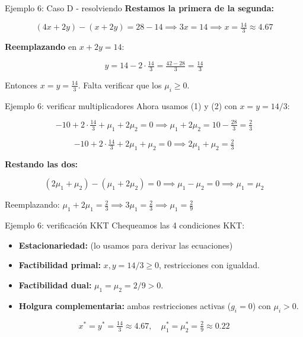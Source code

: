 \documentclass{beamer}
\begin{document}
\begin{frame}{Ejemplo 6: Caso D - resolviendo}
    \small
    \textbf{Restamos la primera de la segunda:}

    \[
    (4x + 2y) - (x + 2y) = 28 - 14 \implies 3x = 14 \implies x = \tfrac{14}{3} \approx 4.67
    \]

    \vspace{0.8em}

    \textbf{Reemplazando} en $x + 2y = 14$:

    \[
    y = 14 - 2 \cdot \tfrac{14}{3} = \tfrac{42 - 28}{3} = \tfrac{14}{3}
    \]

    \vspace{0.8em}

    Entonces $x = y = \frac{14}{3}$. Falta verificar que los $\mu_i \geq 0$.
\end{frame}

\begin{frame}{Ejemplo 6: verificar multiplicadores}
    \small
    Ahora usamos (1) y (2) con $x = y = 14/3$:

    \[
    -10 + 2 \cdot \tfrac{14}{3} + \mu_1 + 2\mu_2 = 0 \implies \mu_1 + 2\mu_2 = 10 - \tfrac{28}{3} = \tfrac{2}{3}
    \]

    \[
    -10 + 2 \cdot \tfrac{14}{3} + 2\mu_1 + \mu_2 = 0 \implies 2\mu_1 + \mu_2 = \tfrac{2}{3}
    \]

    \vspace{0.5em}

    \textbf{Restando las dos:}

    \[
    (2\mu_1 + \mu_2) - (\mu_1 + 2\mu_2) = 0 \implies \mu_1 - \mu_2 = 0 \implies \mu_1 = \mu_2
    \]

    \vspace{0.3em}

    Reemplazando: $\mu_1 + 2\mu_1 = \tfrac{2}{3} \implies 3\mu_1 = \tfrac{2}{3} \implies \mu_1 = \tfrac{2}{9}$
\end{frame}

\begin{frame}{Ejemplo 6: verificación KKT}
    \small
    Chequeamos las 4 condiciones KKT:

    \vspace{0.5em}

    \begin{itemize}
        \item \textbf{Estacionariedad:} \checkmark (lo usamos para derivar las ecuaciones)
        \item \textbf{Factibilidad primal:} $x, y = 14/3 \geq 0$, restricciones con igualdad. \checkmark
        \item \textbf{Factibilidad dual:} $\mu_1 = \mu_2 = 2/9 > 0$. \checkmark
        \item \textbf{Holgura complementaria:} ambas restricciones activas ($g_i = 0$) con $\mu_i > 0$. \checkmark
    \end{itemize}

    \vspace{0.5em}

    \[
    \boxed{x^* = y^* = \tfrac{14}{3} \approx 4.67, \quad \mu_1^* = \mu_2^* = \tfrac{2}{9} \approx 0.22}
    \]
\end{frame}
\end{document}
